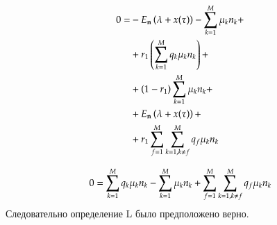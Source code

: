 \begin{equation}\begin{aligned}
    0 = 
    &-E_{\bold{n}}\left( {\lambda + x(\tau)} \right) - \sum_{{k}=1}^{M}\mu_{k}{n}_{k} + \\
    &+r_1 \left( {\sum_{{k}=1}^{M} q_{k}\mu_{k}{n}_{k}} \right) + \\
    &+\left( {1-r_1} \right) \sum_{k=1}^{M}\mu_k n_k + \\
    &+E_{\bold{n}}\left( {\lambda + x(\tau)} \right) + \\
    &+r_1 \sum_{{f}=1}^{M} \sum_{{k}=1, {k} \neq {f}}^{M} q_f \mu_k n_k 
\end{aligned}\end{equation}

\begin{equation}
    0 =
    \sum_{{k}=1}^{M} q_{k}\mu_{k}{n}_{k} 
    -\sum_{k=1}^{M}\mu_k n_k 
    +\sum_{{f}=1}^{M} \sum_{{k}=1, {k} \neq {f}}^{M} q_f \mu_k n_k 
\end{equation}
Следовательно определение L было предположено верно.

